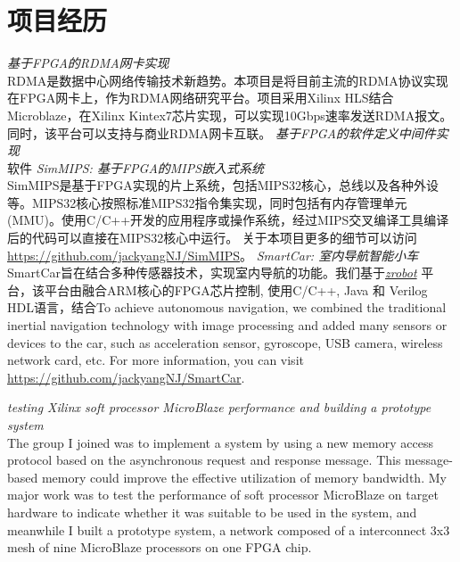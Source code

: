 \documentclass[11pt,a4paper]{moderncv}
\begin{document}
	\section{项目经历}
	{
		\smallskip
		\emph{基于FPGA的RDMA网卡实现}
		\medskip \\
		RDMA是数据中心网络传输技术新趋势。本项目是将目前主流的RDMA协议实现在FPGA网卡上，作为RDMA网络研究平台。项目采用Xilinx HLS结合Microblaze，在Xilinx Kintex7芯片实现，可以实现10Gbps速率发送RDMA报文。同时，该平台可以支持与商业RDMA网卡互联。
	}
	{
		\smallskip
		\emph{基于FPGA的软件定义中间件实现}
		\medskip \\
		软件 
	}
	{
		\smallskip
		\emph{SimMIPS: 基于FPGA的MIPS嵌入式系统}
		\medskip \\
		SimMIPS是基于FPGA实现的片上系统，包括MIPS32核心，总线以及各种外设等。MIPS32核心按照标准MIPS32指令集实现，同时包括有内存管理单元(MMU)。使用C/C++开发的应用程序或操作系统，经过MIPS交叉编译工具编译后的代码可以直接在MIPS32核心中运行。
		关于本项目更多的细节可以访问 \url{https://github.com/jackyangNJ/SimMIPS}。
	}
	{
		\smallskip
		\emph{SmartCar: 室内导航智能小车}
		\medskip  \\
		SmartCar旨在结合多种传感器技术，实现室内导航的功能。我们基于\href{http://zrobot.org/}{\emph{zrobot}} 平台，该平台由融合ARM核心的FPGA芯片控制, 使用C/C++, Java 和 Verilog HDL语言，结合To achieve autonomous navigation, we combined the traditional inertial navigation technology with image processing and added many sensors or devices to the car, such as acceleration sensor, gyroscope, USB camera, wireless network card, etc. For more information, you can visit \url{https://github.com/jackyangNJ/SmartCar}.
	}
	
	{
		\smallskip
		\emph{testing Xilinx soft processor MicroBlaze performance and building a prototype system}
		\medskip  \\
		The group I joined was to implement a system by using a new memory access protocol based on the asynchronous request and response message.
		This message-based memory could improve the effective utilization of memory bandwidth.
		My major work was to test the performance of soft processor MicroBlaze on target hardware to indicate whether it was suitable to be used in the system, and meanwhile I built a prototype system, a network composed of a interconnect 3x3 mesh of nine MicroBlaze processors on one FPGA chip.
	}
	
\end{document}
